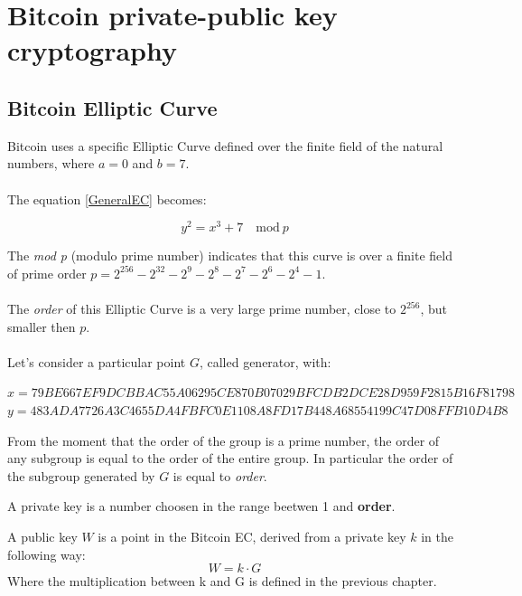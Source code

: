 \section{Bitcoin private-public key cryptography}

\subsection{Bitcoin Elliptic Curve}
Bitcoin uses a specific Elliptic Curve defined over the finite field of the natural numbers, where $a=0$ and $b=7$. \\ \\
The equation \ref{GeneralEC} becomes:

\begin{equation}\label{BitcoinEC}
y^2=x^3+7 \quad \textrm{mod} \ p
\end{equation}

The \textit{mod p} (modulo prime number) indicates that this curve is over a finite field of prime order $p=2^{256}-2^{32}-2^9-2^8-2^7-2^6-2^4-1$.
\\ \\
The \textit{order} of this Elliptic Curve is a very large prime number, close to $2^{256}$, but smaller then $p$. \\ \\
Let's consider a particular point $G$, called generator, with:
\begin{center} 
	$ x=79BE667E F9DCBBAC 55A06295 CE870B07 029BFCDB 2DCE28D9 59F2815B 16F81798$\\
	$y=483ADA77 26A3C465 5DA4FBFC 0E1108A8 FD17B448 A6855419 9C47D08F FB10D4B8$
\end{center}

From the moment that the order of the group is a prime number, the order of any subgroup is equal to the order of the entire group. In particular the order of the subgroup generated by $G$ is equal to \textit{order}.

\begin{definition}
	A private key is a number choosen in the range beetwen 1 and \textbf{order}.
\end{definition}

\begin{definition}
	A public key $W$ is a point in the Bitcoin EC, derived from a private key $k$ in the following way: \\
	\begin{equation}
		W=k\cdot G
	\end{equation}
	Where the multiplication between k and G is defined in the previous chapter.
\end{definition}

